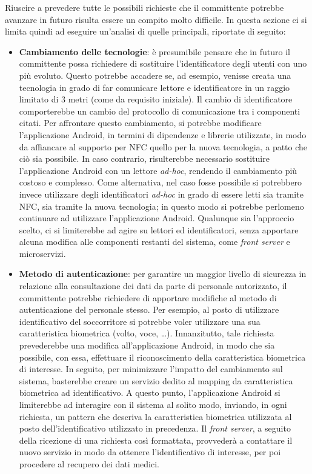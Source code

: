 \documentclass[a4paper,12pt]{report}
\begin{document}
Riuscire a prevedere tutte le possibili richieste che il committente potrebbe avanzare in futuro risulta essere un compito molto difficile. In questa sezione ci si limita quindi ad eseguire un'analisi di quelle principali, riportate di seguito:
\begin{itemize}
	\item \textbf{Cambiamento delle tecnologie}: è presumibile pensare che in futuro il committente possa richiedere di sostituire l'identificatore degli utenti con uno più evoluto. Questo potrebbe accadere se, ad esempio, venisse creata una tecnologia in grado di far comunicare lettore e identificatore in un raggio limitato di 3 metri (come da requisito iniziale). Il cambio di identificatore comporterebbe un cambio del protocollo di comunicazione tra i componenti citati. Per affrontare questo cambiamento, si potrebbe modificare l'applicazione Android, in termini di dipendenze e librerie utilizzate, in modo da affiancare al supporto per NFC quello per la nuova tecnologia, a patto che ciò sia possibile. In caso contrario, risulterebbe necessario sostituire l'applicazione Android con un lettore \emph{ad-hoc}, rendendo il cambiamento più costoso e complesso. Come alternativa, nel caso fosse possibile si potrebbero invece utilizzare degli identificatori \emph{ad-hoc} in grado di essere letti sia tramite NFC, sia tramite la nuova tecnologia; in questo modo si potrebbe perlomeno continuare ad utilizzare l'applicazione Android. Qualunque sia l'approccio scelto, ci si limiterebbe ad agire su lettori ed identificatori, senza apportare alcuna modifica alle componenti restanti del sistema, come \emph{front server} e microservizi.  
	
	\item \textbf{Metodo di autenticazione}: per garantire un maggior livello di sicurezza in relazione alla consultazione dei dati da parte di personale autorizzato, il committente potrebbe richiedere di apportare modifiche al metodo di autenticazione del personale stesso. Per esempio, al posto di utilizzare identificativo del soccorritore si potrebbe voler utilizzare una sua caratteristica biometrica (volto, voce, \dots). Innanzitutto, tale richiesta prevederebbe una modifica all'applicazione Android, in modo che sia possibile, con essa, effettuare il riconoscimento della caratteristica biometrica di interesse. In seguito, per minimizzare l'impatto del cambiamento sul sistema, basterebbe creare un servizio dedito al mapping da caratteristica biometrica ad identificativo. A questo punto, l'applicazione Android si limiterebbe ad interagire con il sistema al solito modo, inviando, in ogni richiesta, un pattern che descriva la caratteristica biometrica utilizzata al posto dell'identificativo utilizzato in precedenza. Il \emph{front server}, a seguito della ricezione di una richiesta così formattata, provvederà a contattare il nuovo servizio in modo da ottenere l'identificativo di interesse, per poi procedere al recupero dei dati medici. 
	

\end{itemize}
\end{document}
